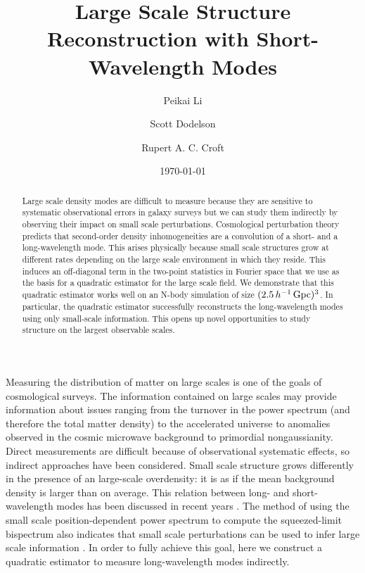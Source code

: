 \documentclass[prd,amsmath,amssymb,floatfix,superscriptaddress,nofootinbib,twocolumn]{revtex4-1}
\begin{document}
\title{Large Scale Structure Reconstruction with Short-Wavelength Modes}
\author{\large Peikai Li}
\author{\large Scott Dodelson}
\author{\large Rupert A. C. Croft}

\date{\today}
\begin{abstract}
\noindent Large scale density modes are difficult to measure because they are sensitive to systematic observational errors in galaxy surveys but we can study them indirectly by observing their impact on small scale perturbations. Cosmological perturbation theory predicts that second-order density inhomogeneities are a convolution of a short- and a long-wavelength mode. This arises physically because small scale structures grow at different rates depending on the large scale environment in which they reside. This induces an off-diagonal term in the two-point statistics in Fourier space that we use as the basis for a quadratic estimator for the large scale field. We demonstrate that this quadratic estimator works well on an N-body simulation of size  $(2.5\,h^{-1}\,\rm Gpc)^3$. In particular, the quadratic estimator successfully reconstructs the long-wavelength modes using only small-scale information. This opens up novel opportunities to study structure on the largest observable scales. 

\end{abstract}
\maketitle
{}
Measuring the distribution of matter on large scales is one of the goals of cosmological surveys. The information contained on large scales may provide information about issues ranging from the turnover in the power spectrum (and therefore the total matter density) to the accelerated universe to anomalies observed in the cosmic microwave background to primordial nongaussianity. Direct measurements are difficult because of observational systematic effects, so indirect approaches have been considered. Small scale structure grows differently in the presence of an large-scale overdensity: it is as if the mean background density is larger than on average. This relation between long- and short-wavelength modes has been discussed in recent years \cite{Baldauf:2011fer}\cite{Li:2014ssc}\cite{Barreira:2017res}. The method of using the small scale position-dependent power spectrum to compute the squeezed-limit bispectrum also indicates that small scale perturbations can be used to infer large scale information \cite{Chiang:2014pos}\cite{Chiang:2015poss}. In order to fully achieve this goal, here we construct a quadratic estimator to measure long-wavelength modes indirectly. 
\end{document}
